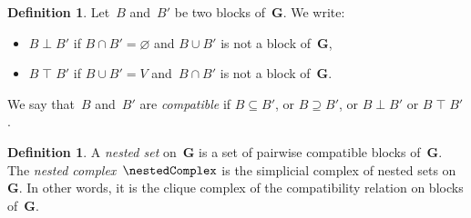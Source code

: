 \documentclass{amsart}
\theoremstyle{definition}
\newtheorem{definition}[theorem]{Definition}
\renewcommand{\b}[1]{{\boldsymbol{#1}}} %
\newcommand{\ssm}{\smallsetminus} %
\newcommand{\darkblue}{\color{darkblue}} %
\newcommand{\defn}[1]{\textsl{\darkblue #1}} %
\newcommand{\vertexSet}{V}
\newcommand{\negDisjoint}{\perp} %
\newcommand{\posDisjoint}{\;\top\;} %
\newcommand{\compl}[1]{#1{}^\textsc{c}} %
\begin{document}
\begin{definition}
  \label{def:compatibleBlocks}
  Let~$B$ and~$B'$ be two blocks of~$\b{G}$.
  We write:
  \begin{itemize}
    \item $B \negDisjoint B'$ if $B \cap B' = \varnothing$ and $B \cup B'$ is not a block of~$\b{G}$,
    \item $B \posDisjoint B'$ if $B \cup B' = \vertexSet$ and~$B \cap B'$ is not a block of~$\b{G}$.
  \end{itemize}
  We say that~$B$ and~$B'$ are \defn{compatible} if $B \subseteq B'$, or $B \supseteq B'$, or $B \negDisjoint B'$ or $B \posDisjoint B'$.
\end{definition}

\begin{definition}
  \label{def:spineComplex}
  A \defn{nested set} on~$\b{G}$ is a set of pairwise compatible blocks of~$\b{G}$.
  The \defn{nested complex}~$\nestedComplex$ is the simplicial complex of nested sets on~$\b{G}$.
  In other words, it is the clique complex of the compatibility relation on blocks of~$\b{G}$.
\end{definition}
\end{document}
